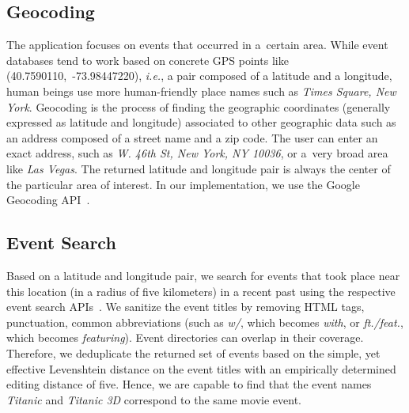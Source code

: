 \documentclass{acm_proc_article-sp}
\let\oldemph\emph
\renewcommand{\emph}[1]{\oldemph{\fontsize{9}{9}\selectfont #1}}
\begin{document}
{\subsection{Geocoding}
The application focuses on events that occurred in a~certain area. While event databases tend to work based on concrete GPS points like
\mbox{(40.7590110, -73.98447220)}, \emph{i.e.}, a pair composed of a latitude and a longitude, human beings use more human-friendly place names such as \emph{Times Square, New York}. Geocoding is the process of finding the geographic coordinates (generally expressed as latitude and longitude) associated to other geographic data such as an address composed of a street name and a zip code. The user can enter an exact address, such as \emph{618 W. 46th St, New York, NY 10036}, or a~very broad area like \emph{Las Vegas}. The returned latitude and longitude pair is always the center of the particular area of interest. In our implementation, we use the Google Geocoding API~\cite{Geocoding2012}.

\subsection{Event Search}
Based on a latitude and longitude pair, we search for events that took place near this location (in a radius of five kilometers) in a recent past using the respective event search APIs~\cite{Eventful2012,Foursquare2012,GooglePlaces2012,Upcoming2012}. We sanitize the event titles by removing HTML tags, punctuation,
common abbreviations (such as \emph{w/}, which becomes \emph{with}, or \emph{ft./feat.}, which becomes \emph{featuring}). Event directories can overlap in their coverage. Therefore, we deduplicate the returned set of events based on the simple, yet effective Levenshtein distance on the event titles with an empirically determined editing distance of five. Hence, we are capable to find that the event names \emph{Titanic} and \emph{Titanic 3D} correspond to the same movie event.

}
\end{document}
